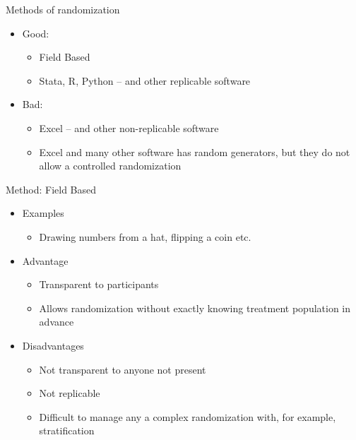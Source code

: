 \documentclass[aspectratio=169]{beamer}
\begin{document}
\begin{frame}{Methods of randomization}
	\begin{itemize}
		\item Good:
		\begin{itemize}
			\item Field Based
			\item Stata, R, Python – and other replicable software
		\end{itemize}
		\item Bad:
		\begin{itemize}
			\item Excel – and other non-replicable software
			\item Excel and many other software has random generators, but they do not allow a controlled randomization
		\end{itemize}
	\end{itemize}
\end{frame}

\begin{frame}{Method: Field Based}
	\begin{itemize}
		\item Examples
		\begin{itemize}
			\item Drawing numbers from a hat, flipping a coin etc.
		\end{itemize}
		\item Advantage
		\begin{itemize}
			\item Transparent to participants
			\item Allows randomization without exactly knowing treatment population in advance
		\end{itemize}
		\item Disadvantages
		\begin{itemize}
			\item Not transparent to anyone not present
			\item Not replicable
			\item Difficult to manage any a complex randomization with, for example, stratification
		\end{itemize}
	\end{itemize}
\end{frame}
\end{document}
